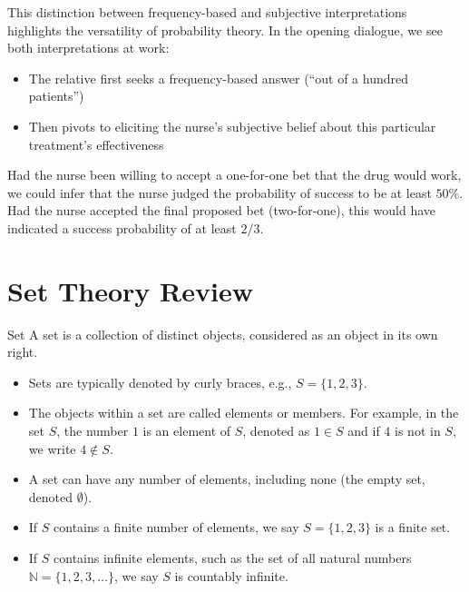 
This distinction between frequency-based and subjective interpretations highlights the versatility of probability theory. In the opening dialogue, we see both interpretations at work:
\begin{itemize}
    \item The relative first seeks a frequency-based answer (``out of a hundred patients'')
    \item Then pivots to eliciting the nurse's subjective belief about this particular treatment's effectiveness
\end{itemize}

Had the nurse been willing to accept a one-for-one bet that the drug would work, we could infer that the nurse judged the probability of success to be at least \(50\%\). Had the nurse accepted the final proposed bet (two-for-one), this would have indicated a success probability of at least \(2/3\).

\section{Set Theory Review}

\begin{definitionboxbreak}{Set}
A set is a collection of distinct objects, considered as an object in its own right.
\begin{itemize}
    \item Sets are typically denoted by curly braces, e.g., \( S = \{1, 2, 3\} \).
    \item The objects within a set are called elements or members. For example, in the set \( S \), the number \( 1 \) is an element of \( S \), denoted as \( 1 \in S \) and if \( 4 \) is not in \( S \), we write \( 4 \notin S \).
    \item A set can have any number of elements, including none (the empty set, denoted \( \emptyset \)).
    \item If \(S\) contains a finite number of elements, we say \(S = \{1,2,3\}\) is a finite set.
    \item If \(S\) contains infinite elements, such as the set of all natural numbers \( \mathbb{N} = \{1, 2, 3, \ldots\} \), we say \(S\) is countably infinite.
\end{itemize}

\end{definitionboxbreak}

\newcommand{\circled}[1]{\tikz[baseline=(char.base)]{
            \node[shape=circle,draw,inner sep=1pt] (char) {#1};}}
            
